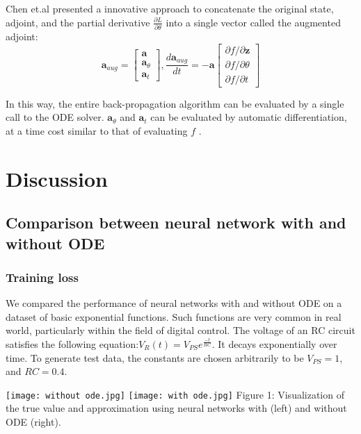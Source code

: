 \documentclass{article}
\begin{document}
Chen et.al presented a innovative approach to concatenate the original state, adjoint, and the partial derivative $\frac{\partial{L}}{\partial{\theta}}$ into a single vector called the augmented adjoint: $$\mathbf{a}_{aug} = \begin{bmatrix}
\mathbf{a} \\
\mathbf{a}_\theta \\
\mathbf{a}_t
\end{bmatrix},
\frac{d\mathbf{a}_{aug}}{dt} = -\mathbf{a}\begin{bmatrix}
\partial f / \partial \mathbf{z} \\
\partial f / \partial \theta \\
\partial f / \partial t
\end{bmatrix}
$$

In this way, the entire back-propagation algorithm can be evaluated by a single call to the ODE solver. $\mathbf{a}_\theta$ and $\mathbf{a}_t$ can be evaluated by automatic differentiation, at a time cost similar to that of evaluating $f$ \cite{chen2019neural}.

\section{Discussion}

\subsection{Comparison between neural network with and without ODE}
\subsubsection{Training loss}

We compared the performance of neural networks with and without ODE on a dataset of basic exponential functions. Such functions are very common in real world, particularly within the field of digital control. The voltage of an RC circuit satisfies the following equation:$V_R(t) = V_{PS} e^{\frac{-t}{RC}}$. It decays exponentially over time. To generate test data, the constants are chosen arbitrarily to be $V_{PS} = 1$, and $RC = 0.4$. 
\begin{center}
\texttt{[image: without ode.jpg]}
\texttt{[image: with ode.jpg]}
    Figure 1: Visualization of the true value and approximation using neural networks with (left) and without ODE (right).
\end{center}
\end{document}
